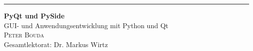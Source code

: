 \begin{titlepage}
\noindent
\begin{minipage}{\textwidth}
\rule{1.5pt}{0.3\textheight}%

\vspace{5mm}
\noindent
{\Huge\bfseries PyQt und PySide} \\[1.5\baselineskip]
{\Large GUI- und Anwendungsentwicklung mit Python und Qt}\\[2\baselineskip]
{\Large \textsc{Peter Bouda}}\\[4\baselineskip]


\vspace{0.1\textheight} %
\noindent
\small Gesamtlektorat: Dr. Markus Wirtz
\\[0.25\baselineskip] %

\makebox[0pt][l]{\rule{1.5pt}{0.335\textheight}}%
\end{minipage}
\end{titlepage}
